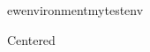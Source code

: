 \documentclass{article}
\begin{document}
\expandafter
ewenvironment\csname mytestenv\endcsname{\center}{\endcenter}
\begin{mytestenv}Centered\end{mytestenv}
\end{document}
